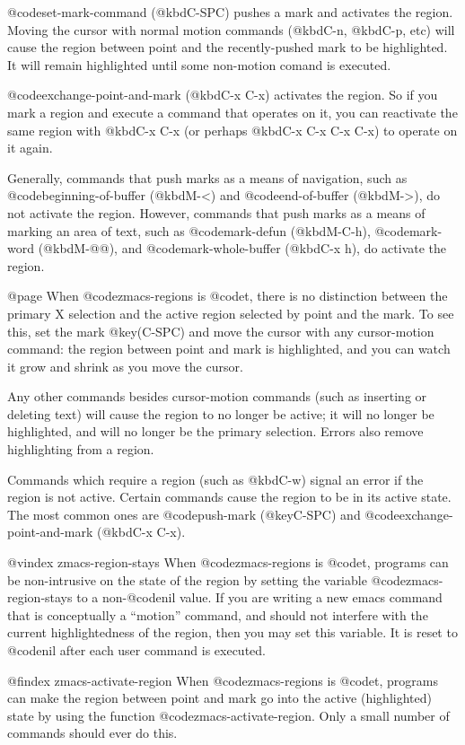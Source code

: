 {{{{@code{set-mark-command} (@kbd{C-SPC}) pushes a mark and activates the
region.  Moving the cursor with normal motion commands (@kbd{C-n},
@kbd{C-p}, etc) will cause the region between point and the
recently-pushed mark to be highlighted.  It will remain highlighted
until some non-motion comand is executed.

@code{exchange-point-and-mark} (@kbd{C-x C-x}) activates the region.
So if you mark a region and execute a command that operates on it, you
can reactivate the same region with @kbd{C-x C-x} (or perhaps @kbd{C-x
C-x C-x C-x}) to operate on it again.

Generally, commands that push marks as a means of navigation, such as
@code{beginning-of-buffer} (@kbd{M-<}) and @code{end-of-buffer}
(@kbd{M->}), do not activate the region.  However, commands that push
marks as a means of marking an area of text, such as @code{mark-defun}
(@kbd{M-C-h}), @code{mark-word} (@kbd{M-@@}), and @code{mark-whole-buffer}
(@kbd{C-x h}), do activate the region.

@page
When @code{zmacs-regions} is @code{t}, there is no distinction between
the primary X selection and the active region selected by point and the
mark.  To see this, set the mark @key{(C-SPC)} and move the cursor
with any cursor-motion command: the region between point and mark is
highlighted, and you can watch it grow and shrink as you move the
cursor.

Any other commands besides cursor-motion commands (such as inserting or
deleting text) will cause the region to no longer be active; it will no
longer be highlighted, and will no longer be the primary selection.
Errors also remove highlighting from a region.

Commands which require a region (such as @kbd{C-w}) signal an error if
the region is not active.  Certain commands cause the region to be in
its active state.  The most common ones are @code{push-mark}
(@key{C-SPC}) and @code{exchange-point-and-mark} (@kbd{C-x C-x}).

@vindex zmacs-region-stays
When @code{zmacs-regions} is @code{t}, programs can be non-intrusive
on the state of the region by setting the variable @code{zmacs-region-stays}
to a non-@code{nil} value.  If you are writing a new emacs command that
is conceptually a ``motion'' command, and should not interfere with the
current highlightedness of the region, then you may set this variable.
It is reset to @code{nil} after each user command is executed.

@findex zmacs-activate-region
When @code{zmacs-regions} is @code{t}, programs can make the region between
point and mark go into the active (highlighted) state by using the
function @code{zmacs-activate-region}. Only a small number of commands
should ever do this. 

}}}}
